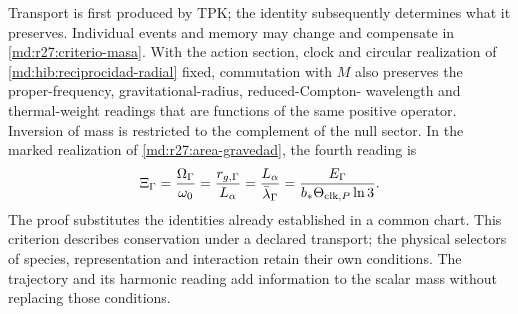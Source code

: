 Transport is first produced by TPK; the identity subsequently determines
what it preserves. Individual events and memory may change and compensate
in \eqref{md:r27:criterio-masa}. With the action section, clock and circular
realization of \eqref{md:hib:reciprocidad-radial} fixed, commutation with
$M$ also preserves the proper-frequency, gravitational-radius, reduced-Compton-
wavelength and thermal-weight readings that are functions of the same positive
operator. Inversion of mass is restricted to the complement of the null sector.
In the marked realization of \eqref{md:r27:area-gravedad}, the fourth reading is
\begin{equation}
 \Xi_\Gamma=\frac{\Omega_\Gamma}{\omega_0}
 =\frac{r_{g,\Gamma}}{L_\alpha}
 =\frac{L_\alpha}{\bar\lambda_\Gamma}
 =\frac{E_\Gamma}{b_*\Theta_{{\rm clk},P}\ln3}.
 \label{md:r27:lecturas-conservadas}
\end{equation}
The proof substitutes the identities already established in a common chart.
This criterion describes conservation under a declared transport; the physical
selectors of species, representation and interaction retain their own
conditions. The trajectory and its harmonic reading add information to the
scalar mass without replacing those conditions.
